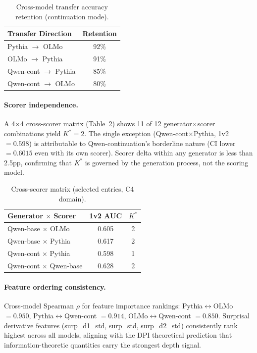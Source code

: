 \documentclass[11pt,a4paper]{article}
\begin{document}
\begin{table}[t]
\centering
\small
\caption{Cross-model transfer accuracy retention (continuation mode).}
\label{tab:transfer}
\begin{tabular}{lc}
\toprule
Transfer Direction & Retention \\
\midrule
Pythia $\to$ OLMo & 92\% \\
OLMo $\to$ Pythia & 91\% \\
Qwen-cont $\to$ Pythia & 85\% \\
Qwen-cont $\to$ OLMo & 80\% \\
\bottomrule
\end{tabular}
\end{table}

\paragraph{Scorer independence.} A 4$\times$4 cross-scorer matrix (Table~\ref{tab:crossscorer}) shows 11 of 12 generator$\times$scorer combinations yield $K^*\!=\!2$. The single exception (Qwen-cont$\times$Pythia, 1v2 $= 0.598$) is attributable to Qwen-continuation's borderline nature (CI lower $= 0.6015$ even with its own scorer). Scorer delta within any generator is less than 2.5pp, confirming that $K^*$ is governed by the generation process, not the scoring model.

\begin{table}[t]
\centering
\small
\caption{Cross-scorer matrix (selected entries, C4 domain).}
\label{tab:crossscorer}
\begin{tabular}{lcc}
\toprule
Generator $\times$ Scorer & 1v2 AUC & $K^*$ \\
\midrule
Qwen-base $\times$ OLMo   & 0.605 & 2 \\
Qwen-base $\times$ Pythia  & 0.617 & 2 \\
Qwen-cont $\times$ Pythia  & 0.598 & 1 \\
Qwen-cont $\times$ Qwen-base & 0.628 & 2 \\
\bottomrule
\end{tabular}
\end{table}

\paragraph{Feature ordering consistency.} Cross-model Spearman $\rho$ for feature importance rankings: Pythia$\leftrightarrow$OLMo $= 0.950$, Pythia$\leftrightarrow$Qwen-cont $= 0.914$, OLMo$\leftrightarrow$Qwen-cont $= 0.850$. Surprisal derivative features (surp\_d1\_std, surp\_std, surp\_d2\_std) consistently rank highest across all models, aligning with the DPI theoretical prediction that information-theoretic quantities carry the strongest depth signal.
\end{document}
